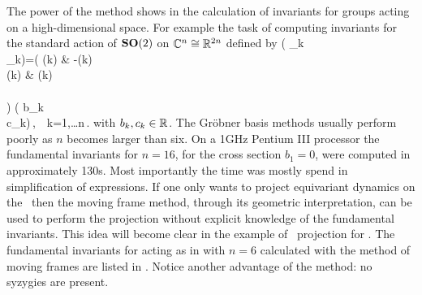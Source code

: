 The power of the method shows in the calculation of invariants for groups acting on a high-dimensional space. For example the
task of computing invariants for the standard action of $\mathbf{SO}(2)$ on $\mathbb{C}^{n}\cong\mathbb{R}^{2n}$ defined by
\beq
	\left( _k \\ _k\earr \right)=\left(
			    			\cos(k\theta) & -\sin(k\theta)\\
						\sin(k\theta) & \cos(k\theta)\\
			   			\earr\\	
						\right) \left( b_k \\ c_k\earr\right)\,,\ \ k=1,\ldots n\,.
	\label{eq:SO2stand}
\eeq
with $b_k,c_k\in\mathbb{R}^{}$. The Gr\"{o}bner basis methods usually perform poorly as $n$ becomes larger than six. On a 1GHz Pentium III processor the fundamental invariants for $n=16$, for the cross
section $b_1=0$, were computed in approximately 130s. Most importantly the time was mostly
spend in simplification of expressions.
If one only wants to project equivariant dynamics on the \reducedsp\ then the moving frame method,
through its geometric interpretation, can be used to perform the projection without explicit knowledge of the fundamental invariants.
This idea will become clear in the example of \reducedsp\ projection
for \CLe. The fundamental invariants for  acting as in  with
$n=6$ calculated with the method of moving frames are listed in . Notice another advantage of the method: no syzygies are present.

